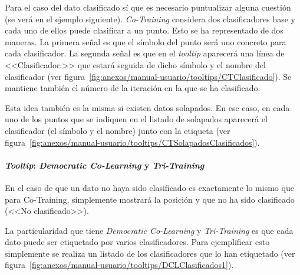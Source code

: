 
Para el caso del dato clasificado sí que es necesario puntualizar alguna
cuestión (se verá en el ejemplo siguiente). \textit{Co-Training} considera dos
clasificadores base y cada uno de ellos puede clasificar a un punto. Esto se ha
representado de dos maneras. La primera señal es que el símbolo del punto será
uno concreto para cada clasificador. La segunda señal es que en el
\textit{tooltip} aparecerá una línea de <<Clasificador:>> que estará seguida de
dicho símbolo y el nombre del clasificador (ver
figura~\ref{fig:anexos/manual-usuario/tooltips/CTClasificado}). Se mantiene
también el número de la iteración en la que se ha clasificado.


Esta idea también es la misma si existen datos solapados. En ese caso, en cada
uno de los puntos que se indiquen en el listado de solapados aparecerá el
clasificador (el símbolo y el nombre) junto con la etiqueta (ver
figura~\ref{fig:anexos/manual-usuario/tooltips/CTSolapadosClasificados}).


\paragraph{\textit{Tooltip}: \textit{Democratic Co-Learning} y \textit{Tri-Training}}

En el caso de que un dato no haya sido clasificado es exactamente lo mismo que
para Co-Training, simplemente mostrará la posición y que no ha sido clasificado
(<<No clasificado>>).

La particularidad que tiene \textit{Democratic Co-Learning} y
\textit{Tri-Training} es que cada dato puede ser etiquetado por varios
clasificadores. Para ejemplificar esto simplemente se realiza un listado de los
clasificadores que lo han etiquetado (ver
figura~\ref{fig:anexos/manual-usuario/tooltips/DCLClasificados1}).


